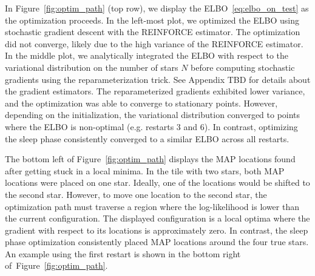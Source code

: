 In Figure~\ref{fig:optim_path} (top row), we display the ELBO~\eqref{eq:elbo_on_test} as the optimization proceeds.
In the left-most plot, we optimized the ELBO using stochastic gradient descent with the REINFORCE estimator.
The optimization did not converge, likely due to the high variance of the REINFORCE estimator. 
In the middle plot, we analytically integrated the ELBO with respect to the variational distribution on the number of stars $N$ before computing stochastic gradients using the reparameterization trick.
See Appendix TBD for details about the gradient estimators. 
The reparameterized gradients exhibited lower variance, and the optimization was able to converge to stationary points. 
However, depending on the initialization, the variational distribution converged to points where the ELBO is non-optimal (e.g. restarts 3 and 6). 
In contrast, optimizing the sleep phase consistently converged to a similar ELBO across all restarts. 

The bottom left of Figure~\ref{fig:optim_path} displays the MAP locations found after getting stuck in a local minima. In the tile with two stars, both MAP locations were placed on one star. Ideally, one of the locations would be shifted to the second star. However, to move one location to the second star, the optimization path must traverse a region where the log-likelihood is lower than the current configuration. The displayed configuration is a local optima where the gradient with respect to its locations is approximately zero. In contrast, the sleep phase optimization consistently placed MAP locations around the four true stars. An example using the first restart is shown in the bottom right of~Figure~\ref{fig:optim_path}.

